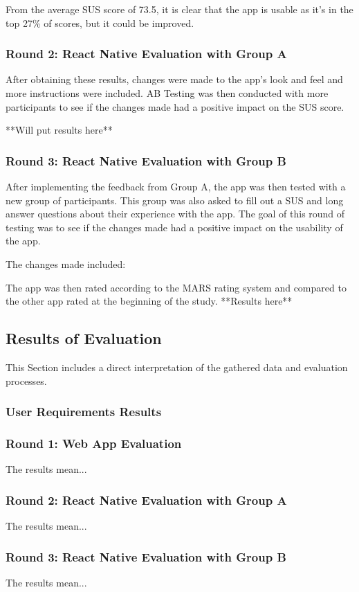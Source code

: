 From the average SUS score of 73.5, it is clear that the app is usable as it's in the top 27\% of scores, but it could be improved.

\subsubsection{Round 2: React Native Evaluation with Group A}

After obtaining these results, changes were made to the app's look and feel and more instructions were included. AB Testing was then conducted with more participants to see if the changes made had a positive impact on the SUS score. 

**Will put results here** 

\subsubsection{Round 3: React Native Evaluation with Group B}
After implementing the feedback from Group A, the app was then tested with a new group of participants. This group was also asked to fill out a SUS and long answer questions about their experience with the app. The goal of this round of testing was to see if the changes made had a positive impact on the usability of the app.

The changes made included: 

The app was then rated according to the MARS rating system and compared to the other app rated at the beginning of the study. **Results here** 

\subsection{Results of Evaluation}
This Section includes a direct interpretation of the gathered data and evaluation processes. 

\subsubsection{User Requirements Results} 

\subsubsection{Round 1: Web App Evaluation}
The results mean...

\subsubsection{Round 2: React Native Evaluation with Group A}
The results mean...

\subsubsection{Round 3: React Native Evaluation with Group B}
The results mean...
